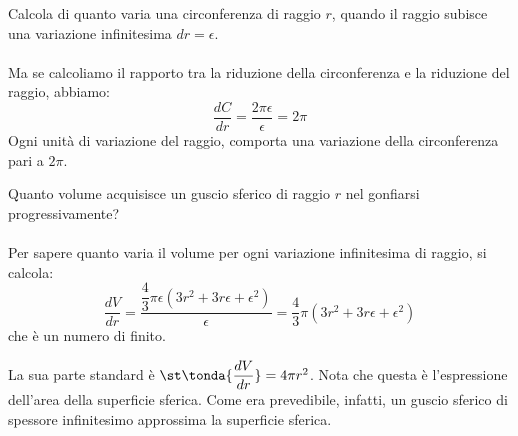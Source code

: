 \begin{esempio}
Calcola di quanto varia una circonferenza di raggio \(r\),
quando il raggio subisce una variazione infinitesima \(dr=\epsilon\).\\

\\

Ma se calcoliamo il rapporto tra la riduzione 
della circonferenza e la riduzione del raggio, abbiamo:
\[\dfrac{dC}{dr}=\dfrac{2\pi \epsilon}{\epsilon}=2\pi\]
Ogni unità di variazione del raggio, comporta una variazione della 
circonferenza pari a \(2\pi\).
\end{esempio}

\begin{esempio}
Quanto volume acquisisce un guscio sferico di raggio \(r\) nel gonfiarsi
progressivamente? \\

\\

Per sapere quanto varia il volume per ogni variazione infinitesima di 
raggio, si calcola:
\[\dfrac{dV}{dr}=
\dfrac{\dfrac{4}{3}\pi \epsilon(3r^2+3r\epsilon+\epsilon^2)}{\epsilon}=
\dfrac{4}{3}\pi (3r^2+3r\epsilon+\epsilon^2)\] 
che è un numero di finito.

La sua parte standard è \(\st\tonda{\dfrac{dV}{dr}}=4\pi r^2\). 
Nota che questa è l'espressione dell'area della superficie sferica. 
Come era prevedibile, infatti, un guscio sferico di spessore infinitesimo 
approssima la superficie sferica.
\end{esempio}

